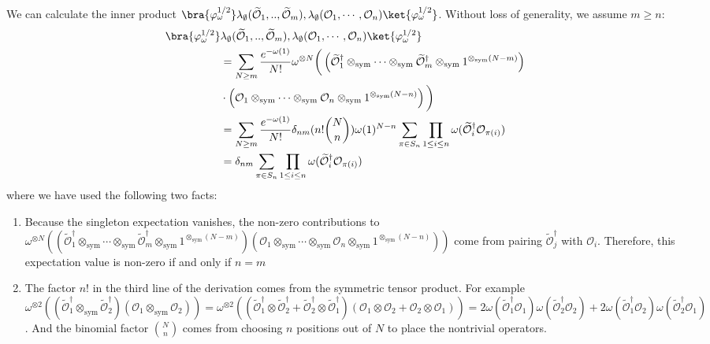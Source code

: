 \documentclass[a4paper,11pt]{article}
\theoremstyle{definition}
\numberwithin{equation}{section}
\newcommand{\lb}{\left(}
\newcommand{\rb}{\right)}
\begin{document}
We can calculate the inner product $\bra{\varphi_\omega^{1/2}}\lambda_\emptyset(\widetilde{\mathcal{O}}_1,..,\widetilde{\mathcal{O}}_m), \lambda_\emptyset(\mathcal{O}_1,\cdots,\mathcal{O}_n)\ket{\varphi_\omega^{1/2}}$. Without loss of generality, we assume $m \geq n$:
\begin{align}
    \begin{split}
        \bra{\varphi_\omega^{1/2}}&\lambda_\emptyset(\widetilde{\mathcal{O}}_1,..,\widetilde{\mathcal{O}}_m), \lambda_\emptyset(\mathcal{O}_1,\cdots,\mathcal{O}_n)\ket{\varphi_\omega^{1/2}} \\&= \sum_{N\geq m}\frac{e^{-\omega(1)}}{N!}\omega^{\otimes N}\bigg(\lb\widetilde{\mathcal{O}}^\dagger_1\otimes_\text{sym}\cdots\otimes_\text{sym}\widetilde{\mathcal{O}}^\dagger_m\otimes_\text{sym} 1^{\otimes_\text{sym}(N-m)}\rb\\&\cdot\lb\mathcal{O}_1\otimes_\text{sym}\cdots\otimes_\text{sym}\mathcal{O}_n\otimes_\text{sym} 1^{\otimes_\text{sym}(N-n)}\rb\bigg)
        \\&=\sum_{N\geq m}\frac{e^{-\omega(1)}}{N!}\delta_{nm}(n!\binom{N}{n})\omega(1)^{N-n}\sum_{\pi\in S_n}\prod_{1\leq i\leq n}\omega(\widetilde{\mathcal{O}}^\dagger_i\mathcal{O}_{\pi(i)})
        \\&=\delta_{nm}\sum_{\pi\in S_n}\prod_{1\leq i\leq n}\omega(\widetilde{\mathcal{O}}^\dagger_i\mathcal{O}_{\pi(i)})
    \end{split}
\end{align}
where we have used the following two facts:
\begin{enumerate}
    \item Because the singleton expectation vanishes, the non-zero contributions to $\omega^{\otimes N}((\widetilde{\mathcal{O}}^\dagger_1\otimes_\text{sym}\cdots\otimes_\text{sym}\widetilde{\mathcal{O}}^\dagger_m\otimes_\text{sym}1^{\otimes_\text{sym}(N-m)})(\mathcal{O}_1\otimes_\text{sym}\cdots\otimes_\text{sym}\mathcal{O}_n\otimes_\text{sym} 1^{\otimes_\text{sym}(N-n)}))$ come from pairing $\widetilde{\mathcal{O}}^\dagger_j$ with $\mathcal{O}_i$. Therefore, this expectation value is non-zero if and only if $n = m$
    \item The factor $n!$ in the third line of the derivation comes from the symmetric tensor product. For example $\omega^{\otimes 2}((\widetilde{\mathcal{O}}^\dagger_1\otimes_\text{sym} \widetilde{\mathcal{O}}^\dagger_2)(\mathcal{O}_1\otimes_\text{sym}\mathcal{O}_2)) = \omega^{\otimes 2}((\widetilde{\mathcal{O}}^\dagger_1\otimes \widetilde{\mathcal{O}}^\dagger_2 + \widetilde{\mathcal{O}}^\dagger_2 \otimes \widetilde{\mathcal{O}}^\dagger_1)(\mathcal{O}_1\otimes \mathcal{O}_2 + \mathcal{O}_2\otimes \mathcal{O}_1)) = 2\omega(\widetilde{\mathcal{O}}^\dagger_1\mathcal{O}_1)\omega(\widetilde{\mathcal{O}}^\dagger_2\mathcal{O}_2) + 2\omega(\widetilde{\mathcal{O}}^\dagger_1\mathcal{O}_2)\omega(\widetilde{\mathcal{O}}^\dagger_2\mathcal{O}_1)$. And the binomial factor $\binom{N}{n}$ comes from choosing $n$ positions out of $N$ to place the nontrivial operators. 
\end{enumerate}
\end{document}
